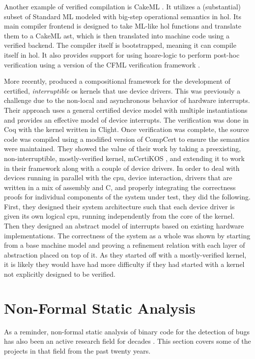 Another example of verified compilation is CakeML \autocite{kumar2014cakeml}.
It utilizes a (substantial)
subset of Standard ML modeled with big-step operational semantics in \ac{hol}.
Its main compiler frontend is designed to take ML-like \ac{hol} functions
and translate them to a CakeML \ac{ast}, which is then translated into machine code
using a verified backend. The compiler itself is bootstrapped,
meaning it can compile itself in \ac{hol}. It also provides support for using \gls{hoare-logic}
to perform post-hoc verification using a version of the CFML verification framework
\autocite{gueneau2017formulae,arthur2015union,chargueraud2011cfv}.

More recently, \textcite{chen2018compositional} produced a compositional framework
for the development of certified, \emph{interruptible}%
\ac{os} kernels that use device drivers.%
This was previously a challenge due to the non-local and asynchronous behavior
of hardware interrupts. Their approach uses a general certified device model
with multiple instantiations and provides an effective model of device interrupts.
The verification was done in Coq with the kernel written in Clight.
Once verification was complete, the source code was compiled using a modified version
of CompCert to ensure the semantics were maintained.
They showed the value of their work by taking a preexisting,
non-interruptible, mostly-verified kernel, mCertiKOS \autocite{costanzo2016endtoend},
and extending it to work in their framework along with a couple of device drivers.
In order to deal with devices running in parallel with the \ac{cpu},
device interaction, drivers that are written in a mix of assembly and C,
and properly integrating the correctness proofs for individual components
of the system under test, they did the following.
First, they designed their system architecture such that each device driver
is given its own logical \ac{cpu}, running independently from the core of the kernel.
Then they designed an abstract model of interrupts
based on existing hardware implementations.
The correctness of the system as a whole was shown
by starting from a base machine model
and proving a refinement relation with each layer of abstraction placed on top of it.
As they started off with a mostly-verified kernel, it is likely they would have had
more difficulty if they had started with a kernel
not explicitly designed to be verified.

\section{Non-Formal Static Analysis}\label{se:static_analysis}
As a reminder, non-formal static analysis of binary code for the detection of bugs has also been an active research field for decades \autocite{kruegel2005automating,wang2017angr}.
This section covers some of the projects in that field from the past twenty years.

